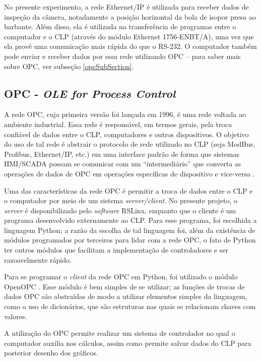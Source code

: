 No presente experimento, a rede Ethernet/IP é utilizada para receber dados de inspeção da câmera, notadamente a posição horizontal da bola de isopor presa ao barbante. Além disso, ela é utilizada na transferência de programas entre o computador e o CLP (através do módulo Ethernet 1756-ENBT/A), uma vez que ela provê uma comunicação mais rápida do que o RS-232. O computador também pode enviar e receber dados por essa rede utilizando OPC -- para saber mais sobre OPC, ver subseção \ref{opcSubSection}.

\subsection{OPC - \textit{OLE for Process Control} \label{opcSubSection}}
A rede OPC, cuja primeira versão foi lançada em 1996, é uma rede voltada ao ambiente industrial. Essa rede é responsável, em termos gerais, pela troca confiável de dados entre o CLP, computadores e outros dispositivos. O objetivo do uso de tal rede é abstrair o protocolo de rede utilizado no CLP (seja ModBus, Profibus, Ethernet/IP, etc.) em uma interface padrão de forma que sistemas HMI/SCADA possam se comunicar com um ``intermediário'' que converta as operações de dados de OPC em operações específicas de dispositivo e vice-versa \cite{OPCFoundation1}. 

Uma das características da rede OPC é permitir a troca de dados entre o CLP e o computador por meio de um sistema \textit{server/client}. No presente projeto, o \textit{server} é disponibilizado pelo \textit{software} RSLinx, enquanto que o cliente é um programa desenvolvido externamente ao CLP. Para esse programa, foi escolhida a linguagem Python; a razão da escolha de tal linguagem foi, além da existência de módulos programados por terceiros para lidar com a rede OPC, o fato de Python ter outros módulos que facilitam a implementação de controladores e ser razoavelmente rápido.

Para se programar o \textit{client} da rede OPC em Python, foi utilizado o módulo OpenOPC \cite{OpenOPC}. Esse módulo é bem simples de se utilizar; as funções de trocas de dados OPC são abstraídas de modo a utilizar elementos simples da linguagem, como o uso de dicionários, que são estruturas nas quais se relacionam chaves com valores. 

A utilização do OPC permite realizar um sistema de controlador no qual o computador auxilia nos cálculos, assim como permite salvar dados do CLP para posterior desenho dos gráficos.


